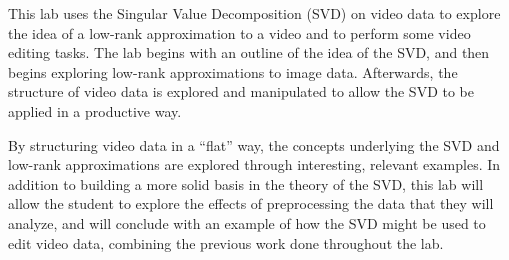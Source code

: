 This lab uses the Singular Value Decomposition (SVD) on video data to explore the idea of a low-rank approximation to a video and to perform some video editing tasks. The lab begins with an outline of the idea of the SVD, and then begins exploring low-rank approximations to image data. Afterwards, the structure of video data is explored and manipulated to allow the SVD to be applied in a productive way.

By structuring video data in a ``flat'' way, the concepts underlying the SVD and low-rank approximations are explored through interesting, relevant examples. In addition to building a more solid basis in the theory of the SVD, this lab will allow the student to explore the effects of preprocessing the data that they will analyze, and will conclude with an example of how the SVD might be used to edit video data, combining the previous work done throughout the lab.
